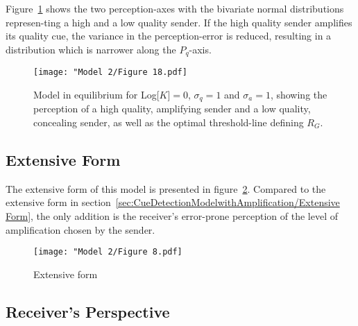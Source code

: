 \documentclass[a4paper,12pt]{article}
\numberwithin{equation}{section}
\begin{document}
Figure~\ref{fig:Model 2/Figure 18.pdf} shows the two perception-axes with the bivariate normal distributions represen-ting a high and a low quality sender. If the high quality sender amplifies its quality cue, the variance in the perception-error is reduced, resulting in a distribution which is narrower along the $P_{q}$-axis.
\begin{figure}[!h]
\captionsetup{width=380pt}
\begin{center}
\leavevmode
\texttt{[image: "Model 2/Figure 18.pdf]}
\caption{Model in equilibrium for Log[$K$]$=0$, $\sigma_{q}=1$ and $\sigma_{a}=1$, showing the perception of a high quality, amplifying sender and a low quality, concealing sender, as well as the optimal threshold-line defining $R_{G}$.}
\label{fig:Model 2/Figure 18.pdf}
\end{center}
\end{figure}

\subsection{Extensive Form}
\label{sec:CueDetectionModelwithObservableAmplification/Extensive Form}

The extensive form of this model is presented in figure~\ref{fig:Model 2/Figure 8.pdf}. Compared to the extensive form in section~\ref{sec:CueDetectionModelwithAmplification/Extensive Form}, the only addition is the receiver's error-prone perception of the level of amplification chosen by the sender.

\begin{figure}[h]
\begin{center}
\leavevmode
\texttt{[image: "Model 2/Figure 8.pdf]}
\caption{Extensive form}
\label{fig:Model 2/Figure 8.pdf}
\end{center}
\end{figure}


\subsection{Receiver's Perspective}
\label{sec:CueDetectionModelwithObservableAmplification/Receiver's Perspective}
\end{document}
